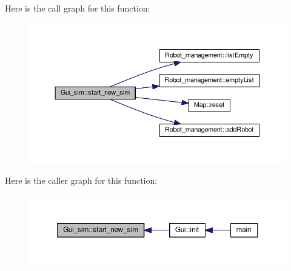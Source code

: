 Here is the call graph for this function\-:
\nopagebreak
\begin{figure}[H]
\begin{center}
\leavevmode
\includegraphics[width=350pt]{class_gui__sim_abb1df0449546eb8b1004a6160291ecad_cgraph}
\end{center}
\end{figure}




Here is the caller graph for this function\-:
\nopagebreak
\begin{figure}[H]
\begin{center}
\leavevmode
\includegraphics[width=350pt]{class_gui__sim_abb1df0449546eb8b1004a6160291ecad_icgraph}
\end{center}
\end{figure}




